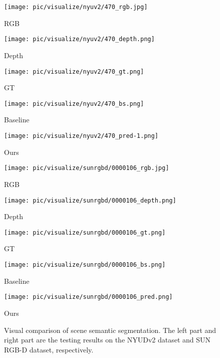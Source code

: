 \documentclass[10pt,twocolumn,letterpaper]{article}
\begin{document}
\begin{figure*}[t]
\begin{minipage}[c]{0.091\linewidth}
      \texttt{[image: pic/visualize/nyuv2/470\_rgb.jpg]}
      \centerline{ RGB }
   \end{minipage}
   \begin{minipage}[c]{0.091\linewidth}
      \texttt{[image: pic/visualize/nyuv2/470\_depth.png]}
      \centerline{ Depth }
   \end{minipage}
   \begin{minipage}[c]{0.091\linewidth}
      \texttt{[image: pic/visualize/nyuv2/470\_gt.png]}
      \centerline{GT}
   \end{minipage}
   \begin{minipage}[c]{0.091\linewidth}
      \texttt{[image: pic/visualize/nyuv2/470\_bs.png]}
      \centerline{Baseline }
   \end{minipage}
   \begin{minipage}[c]{0.091\linewidth}
      \texttt{[image: pic/visualize/nyuv2/470\_pred-1.png]}
      \centerline{Ours }
   \end{minipage}\hspace{3pt}
   \begin{minipage}[c]{0.091\linewidth}
      \texttt{[image: pic/visualize/sunrgbd/0000106\_rgb.jpg]}
      \centerline{RGB }
   \end{minipage}
   \begin{minipage}[c]{0.091\linewidth}
      \texttt{[image: pic/visualize/sunrgbd/0000106\_depth.png]}
      \centerline{ Depth }
   \end{minipage}
   \begin{minipage}[c]{0.091\linewidth}
      \texttt{[image: pic/visualize/sunrgbd/0000106\_gt.png]}
      \centerline{ GT}
   \end{minipage}
   \begin{minipage}[c]{0.091\linewidth}
      \texttt{[image: pic/visualize/sunrgbd/0000106\_bs.png]}
      \centerline{Baseline }
   \end{minipage}
   \begin{minipage}[c]{0.091\linewidth}
      \texttt{[image: pic/visualize/sunrgbd/0000106\_pred.png]}
      \centerline{Ours }
   \end{minipage}
   \caption{Visual comparison of scene semantic segmentation. The left part and right part are the testing results on the NYUDv2 dataset and SUN RGB-D dataset, respectively.}
   \label{visualization}
\end{figure*}
\end{document}
